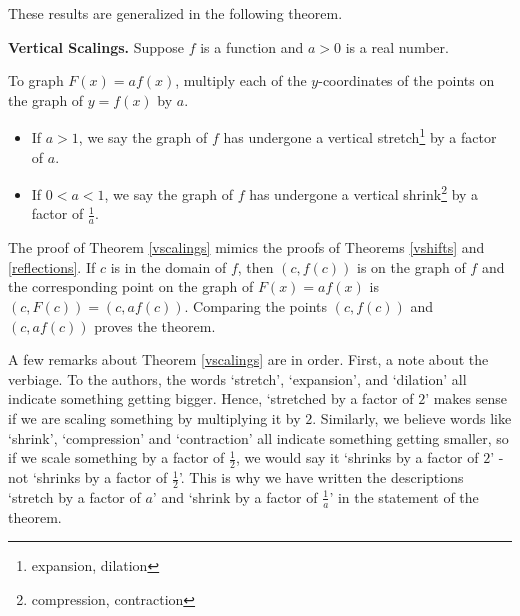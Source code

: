 These results are generalized in the following theorem.

\smallskip

\colorbox{ResultColor}{\bbm


\begin{thm} \label{vscalings}\textbf{Vertical Scalings.} Suppose $f$ is a function and $a>0$ is a real number. 

To graph $F(x) = af(x)$, multiply each of the $y$-coordinates of the points on the graph of $y=f(x)$ by $a$. 

\begin{itemize}

\item If $a > 1$, we say the graph of $f$ has undergone a vertical stretch\footnote{expansion, dilation} by a factor of $a$. 

\item If $0 < a < 1$, we say the graph of $f$ has undergone a vertical shrink\footnote{ compression, contraction} by a factor of $\frac{1}{a}$.

\end{itemize}

\end{thm}

\ebm}

\smallskip

The proof of Theorem \ref{vscalings} mimics the proofs of Theorems \ref{vshifts} and \ref{reflections}.  If $c$ is in the domain of $f$, then $(c, f(c))$ is on the graph of $f$ and the corresponding point on the graph of $F(x)=af(x)$ is $(c, F(c)) = (c, a f(c))$.  Comparing the points $(c, f(c))$ and $(c, a f(c))$ proves the theorem.  

\smallskip

A few remarks about Theorem \ref{vscalings} are in order.  First, a note about the verbiage.  To the authors, the words `stretch', `expansion', and `dilation' all indicate something getting bigger.  Hence, `stretched by a factor of $2$' makes sense if we are scaling something by multiplying it by $2$. Similarly, we believe words like `shrink', `compression' and `contraction' all indicate something getting smaller, so if we scale something by a factor of $\frac{1}{2}$, we would say it `shrinks by a factor of $2$' - not `shrinks by a factor of $\frac{1}{2}$'.  This is why we have written the descriptions `stretch by a factor of $a$' and `shrink by a factor of $\frac{1}{a}$' in the statement of the theorem.  

